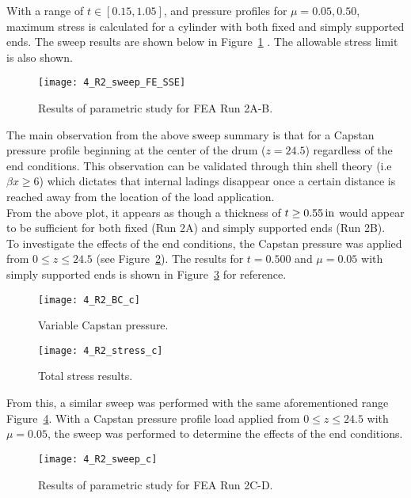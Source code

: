 With a range of $t\in [0.15, 1.05]$, and pressure profiles for $\mu =0.05, 0.50$, maximum stress is calculated for a cylinder with both fixed and simply supported ends. The sweep results are shown below in Figure~\ref{fig:4_R2_sweep} \cite{EXCEL}.  The allowable stress limit is also shown.

\begin{figure}[H]
	\centering
	\texttt{[image: 4\_R2\_sweep\_FE\_SSE]}
	\caption{Results of parametric study for FEA Run 2A-B.}
	\label{fig:4_R2_sweep}
\end{figure}

The main observation from the above sweep summary is that for a Capstan pressure profile beginning at the center of the drum ($z=24.5$) regardless of the end conditions. This observation can be validated through thin shell theory (i.e $\beta x \geq 6$) which dictates that internal ladings disappear once a certain distance is reached away from the location of the load application.\\

From the above plot, it appears as though a thickness of $t \geq 0.55 \,\mathrm{in}$ would appear to be sufficient for both fixed (Run 2A) and simply supported ends (Run 2B).\\

To investigate the effects of the end conditions, the Capstan pressure was applied from $0 \leq z \leq 24.5$ (see Figure~\ref{fig:4_R2_BC_c}). The results for $t=0.500$ and $\mu=0.05$ with simply supported ends is shown in Figure~\ref{fig:4_R2_stress_c} for reference.
\begin{figure}[H]
	\centering
	\texttt{[image: 4\_R2\_BC\_c]}
	\caption{Variable Capstan pressure.}
	\label{fig:4_R2_BC_c}
\end{figure}

\begin{figure}[H]
	\centering
	\texttt{[image: 4\_R2\_stress\_c]}
	\caption{Total stress results.}
	\label{fig:4_R2_stress_c}
\end{figure}

From this, a similar sweep was performed with the same aforementioned range Figure~\ref{fig:4_R2_sweep2}. With a Capstan pressure profile load applied from $0 \leq z \leq 24.5$ with $\mu=0.05$, the sweep was performed to determine the effects of the end conditions.

\begin{figure}[H]
	\centering
	\texttt{[image: 4\_R2\_sweep\_c]}
	\caption{Results of parametric study for FEA Run 2C-D.}
	\label{fig:4_R2_sweep2}
\end{figure}


